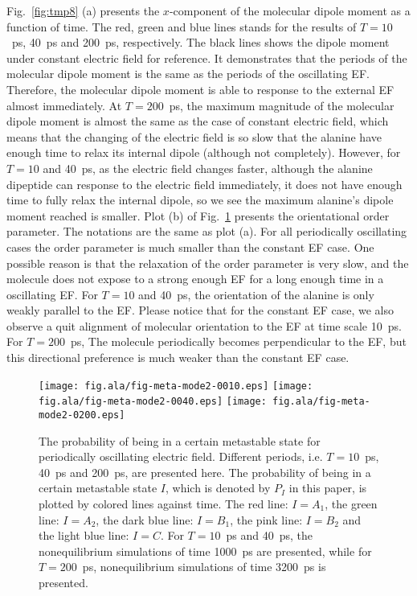 \documentclass[a4paper,preprint,unsortedaddress,onecolumn]{revtex4-1}
\begin{document}
Fig.~\ref{fig:tmp8} (a)
presents the $x$-component of the molecular dipole moment as
a function of time. The red, green and blue lines stands for the
results of $T=10$~ps, 40~ps and 200~ps, respectively. The black lines
shows the dipole moment under constant electric field
for reference.
It demonstrates that the periods of the molecular dipole moment
is the same as the periods of the oscillating EF. Therefore,
the molecular dipole moment
is able to response to the external EF almost immediately.
At $T=200$~ps, the maximum magnitude of the molecular
dipole moment is almost the same as the case of constant electric field, which
means that the changing of the electric field is so slow that the
alanine have enough time to 
relax its internal dipole (although not completely). However,
for $T=10$ and 40~ps, as the electric field changes faster,
although the alanine dipeptide can response to the electric field immediately,
it does not have enough time to fully relax the internal dipole, so we
see the maximum alanine's dipole moment reached is smaller.
Plot (b) of Fig.~\ref{fig:tmp9} presents the orientational order
parameter. The notations are the same as plot (a).
For all periodically oscillating cases the order parameter is much
smaller than the constant EF case. One possible reason is that the
relaxation of the order parameter is very slow, and the molecule does
not expose to a strong enough EF for a long enough time in a oscillating
EF. For  $T=10$ and 40~ps, the orientation of the alanine is only weakly
parallel to the EF. Please notice that for the constant EF case,
we also observe a quit alignment of molecular orientation to the EF
at time scale 10~ps. For $T=200$~ps, The molecule periodically
becomes perpendicular to the EF, but this directional preference is much
weaker than the constant EF case.

\begin{figure}
  \centering
  \texttt{[image: fig.ala/fig-meta-mode2-0010.eps]}
  \texttt{[image: fig.ala/fig-meta-mode2-0040.eps]}
  \texttt{[image: fig.ala/fig-meta-mode2-0200.eps]}
  \caption{ The probability of being in a certain metastable state for
    periodically oscillating electric field. Different periods,
    i.e. $T=10$~ps, 40~ps and 200~ps, are presented here.  The
    probability of being in a certain metastable state $I$, which is
    denoted by $P_I$ in this paper, is plotted by colored lines against
    time. The red line: $I = A_1$, the green line: $I = A_2$, the dark
    blue line: $I = B_1$, the pink line: $I = B_2$ and the light blue
    line: $I = C$. For $T=10$~ps and 40~ps, the nonequilibrium
    simulations of time 1000~ps are presented, while for $T=200$~ps,
    nonequilibrium simulations of time 3200~ps is presented.  }
  \label{fig:tmp9}
\end{figure}
\end{document}
